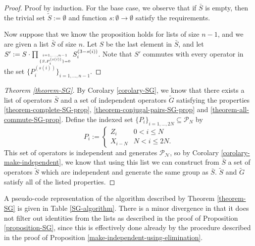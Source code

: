 \documentclass[twocolumn,showpacs,preprintnumbers,amsmath,amssymb,nofootinbib,pra,floatfix]{revtex4}
\newenvironment{remark}[1][Remark]{\begin{trivlist}
\item[\hskip \labelsep {\bfseries #1}]}{\end{trivlist}}
\newcommand{\lst}{\bar}
\newcommand{\set}{\tilde}
\begin{document}
\begin{proof}
Proof by induction.  For the base case, we observe that if $\lst S$ is empty, then the trivial set $\set S:=\emptyset$  and function $s:\emptyset\to\emptyset$ satisfy the requirements.

Now suppose that we know the proposition holds for lists of size $n-1$, and we are given a list $\lst S$ of size $n$.  Let $S$ be the last element in $\lst S$, and let $S':=S\cdot \prod_{i=1,\dots,n-1 \atop \{S,P_i^{(s(i))}\}=0} S^{(3-s(i))}_i$.  Note that $S'$ commutes with every operator in the set $\{P_i^{(s(i))}\}_{i=1,\dots,n-1}$.
\end{proof}
\begin{proof}[Theorem \ref{theorem-SG}]
By Corolary \ref{corolary-SG}, we know that there exists a list of operators $\lst S$ and a set of independent operators $\set G$ satisfying the properties \ref{theorem-complete-SG-prop}, \ref{theorem-conjugal-pairs-SG-prop} and \ref{theorem-all-commute-SG-prop}.  Define the indexed set $\{P_i\}_{i=1,\dots,2N}\subseteq \mathscr{P}_N$ by
$$
P_i :=
\begin{cases}
Z_i & 0 < i \le N \\
X_{i-N} & N < i \le 2N.
\end{cases}
$$  This set of operators is independent and generates $\mathscr{P_N}$, so by Corolary \ref{corolary-make-independent}, we know that using this list we can construct from $\lst S$ a set of operators $\set S$ which are independent and generate the same group as $\lst S$.  $\set S$ and $\set G$ satisfy all of the listed properties.
\end{proof}
\begin{remark}
A pseudo-code representation of the algorithm described by Theorem \ref{theorem-SG} is given in Table  \ref{SG-algorithm}.  There is a minor divergence in that it does not filter out identities from the lists as described in the proof of Proposition \ref{proposition-SG}, since this is effectively done already by the procedure described in the proof of Proposition \ref{make-independent-using-elimination}.
\end{remark}
\end{document}
